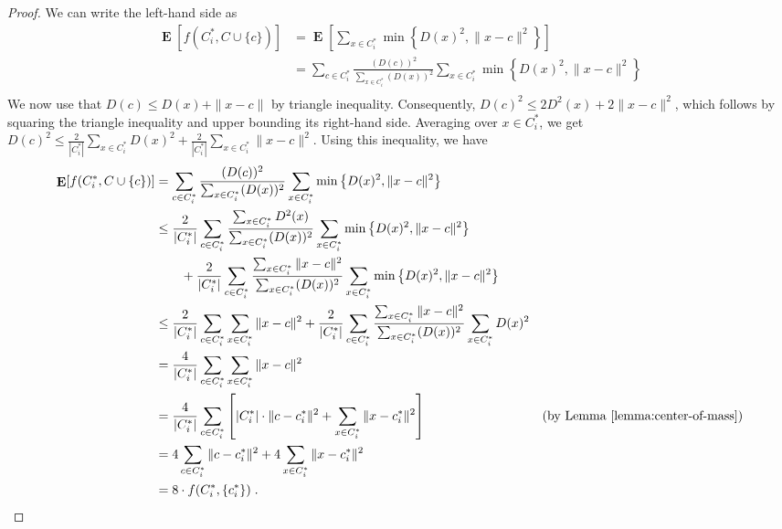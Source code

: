 \documentclass{article}
\newcommand{\norm}[1]{\|{#1}\|}
\DeclareMathOperator*{\Exp}{\mathbf{E}}
\begin{document}
\begin{proof}
We can write the left-hand side as
\begin{align*}
\Exp[f(C_i^*, C \cup \{c\})]
& = \Exp\left[ \sum_{x \in C_i^*} \min\left\{D(x)^2, \norm{x-c}^2 \right\} \right] \\
& = \sum_{c \in C^*_i} \frac{(D(c))^2}{\sum_{x \in C_i^*} (D(x))^2} \sum_{x \in C_i^*} \min\left\{D(x)^2, \norm{x - c}^2\right\} \\
\end{align*}
We now use that $D(c) \le D(x) + \norm{x - c}$ by triangle inequality.
Consequently, $D(c)^2 \le 2 D^2(x) + 2 \norm{x - c}^2$, which follows by squaring
the triangle inequality and upper bounding its right-hand side.  Averaging over $x \in
C_i^*$, we get $D(c)^2 \le \frac{2}{|C_i^*|} \sum_{x \in C_i^*} D(x)^2 +
\frac{2}{|C_i^*|} \sum_{x \in C_i^*} \norm{x - c}^2$.
Using this inequality, we have
\begin{align*}
\Exp[f(C_i^*, C \cup \{c\})]
& = \sum_{c \in C^*_i} \frac{(D(c))^2}{\sum_{x \in C_i^*} (D(x))^2} \sum_{x \in C_i^*} \min\left\{D(x)^2, \norm{x - c}^2\right\} \\
& \le \frac{2}{|C^*_i|} \sum_{c \in C^*_i} \frac{\sum_{x \in C_i^*} D^2(x)}{\sum_{x \in C_i^*} (D(x))^2} \sum_{x \in C_i^*} \min\left\{D(x)^2, \norm{x - c}^2\right\} \\
& \qquad + \frac{2}{|C^*_i|} \sum_{c \in C^*_i} \frac{\sum_{x \in C_i^*} \norm{x-c}^2}{\sum_{x \in C_i^*} (D(x))^2} \sum_{x \in C_i^*} \min\left\{D(x)^2, \norm{x - c}^2\right\} \\
& \le \frac{2}{|C^*_i|} \sum_{c \in C^*_i} \sum_{x \in C_i^*} \norm{x - c}^2 + \frac{2}{|C_i^*|} \sum_{c \in C^*_i} \frac{\sum_{x \in C_i^*} \norm{x-c}^2}{\sum_{x \in C_i^*} (D(x))^2} \sum_{x \in C_i^*} D(x)^2 \\
& = \frac{4}{|C^*_i|} \sum_{c \in C^*_i} \sum_{x \in C_i^*} \norm{x - c}^2 \\
& = \frac{4}{|C^*_i|} \sum_{c \in C^*_i} \left[ |C^*_i| \cdot \norm{c - c^*_i}^2 + \sum_{x \in C_i^*} \norm{x - c_i^*}^2 \right] & \text{(by Lemma~\ref{lemma:center-of-mass})} \\
& = 4 \sum_{c \in C^*_i} \norm{c - c^*_i}^2 + 4 \sum_{x \in C_i^*} \norm{x - c_i^*}^2 \\
& = 8 \cdot f(C^*_i, \{c^*_i\}) \; .
\end{align*}

\end{proof}
\end{document}
